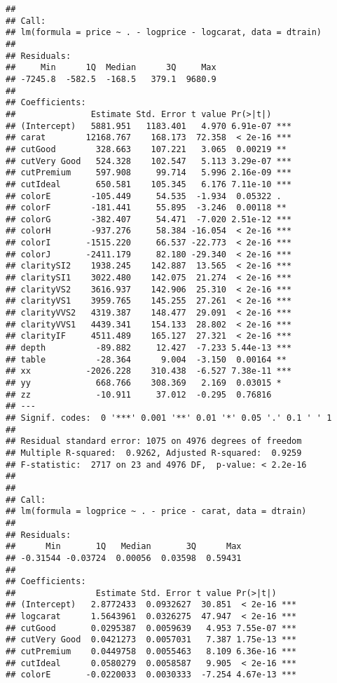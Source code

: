 \documentclass[]{article}
\begin{document}
\begin{verbatim}
## 
## Call:
## lm(formula = price ~ . - logprice - logcarat, data = dtrain)
## 
## Residuals:
##     Min      1Q  Median      3Q     Max 
## -7245.8  -582.5  -168.5   379.1  9680.9 
## 
## Coefficients:
##               Estimate Std. Error t value Pr(>|t|)    
## (Intercept)   5881.951   1183.401   4.970 6.91e-07 ***
## carat        12168.767    168.173  72.358  < 2e-16 ***
## cutGood        328.663    107.221   3.065  0.00219 ** 
## cutVery Good   524.328    102.547   5.113 3.29e-07 ***
## cutPremium     597.908     99.714   5.996 2.16e-09 ***
## cutIdeal       650.581    105.345   6.176 7.11e-10 ***
## colorE        -105.449     54.535  -1.934  0.05322 .  
## colorF        -181.441     55.895  -3.246  0.00118 ** 
## colorG        -382.407     54.471  -7.020 2.51e-12 ***
## colorH        -937.276     58.384 -16.054  < 2e-16 ***
## colorI       -1515.220     66.537 -22.773  < 2e-16 ***
## colorJ       -2411.179     82.180 -29.340  < 2e-16 ***
## claritySI2    1938.245    142.887  13.565  < 2e-16 ***
## claritySI1    3022.480    142.075  21.274  < 2e-16 ***
## clarityVS2    3616.937    142.906  25.310  < 2e-16 ***
## clarityVS1    3959.765    145.255  27.261  < 2e-16 ***
## clarityVVS2   4319.387    148.477  29.091  < 2e-16 ***
## clarityVVS1   4439.341    154.133  28.802  < 2e-16 ***
## clarityIF     4511.489    165.127  27.321  < 2e-16 ***
## depth          -89.882     12.427  -7.233 5.44e-13 ***
## table          -28.364      9.004  -3.150  0.00164 ** 
## xx           -2026.228    310.438  -6.527 7.38e-11 ***
## yy             668.766    308.369   2.169  0.03015 *  
## zz             -10.911     37.012  -0.295  0.76816    
## ---
## Signif. codes:  0 '***' 0.001 '**' 0.01 '*' 0.05 '.' 0.1 ' ' 1
## 
## Residual standard error: 1075 on 4976 degrees of freedom
## Multiple R-squared:  0.9262, Adjusted R-squared:  0.9259 
## F-statistic:  2717 on 23 and 4976 DF,  p-value: < 2.2e-16
## 
## 
## Call:
## lm(formula = logprice ~ . - price - carat, data = dtrain)
## 
## Residuals:
##      Min       1Q   Median       3Q      Max 
## -0.31544 -0.03724  0.00056  0.03598  0.59431 
## 
## Coefficients:
##                Estimate Std. Error t value Pr(>|t|)    
## (Intercept)   2.8772433  0.0932627  30.851  < 2e-16 ***
## logcarat      1.5643961  0.0326275  47.947  < 2e-16 ***
## cutGood       0.0295387  0.0059639   4.953 7.55e-07 ***
## cutVery Good  0.0421273  0.0057031   7.387 1.75e-13 ***
## cutPremium    0.0449758  0.0055463   8.109 6.36e-16 ***
## cutIdeal      0.0580279  0.0058587   9.905  < 2e-16 ***
## colorE       -0.0220033  0.0030333  -7.254 4.67e-13 ***

\end{verbatim}
\end{document}
